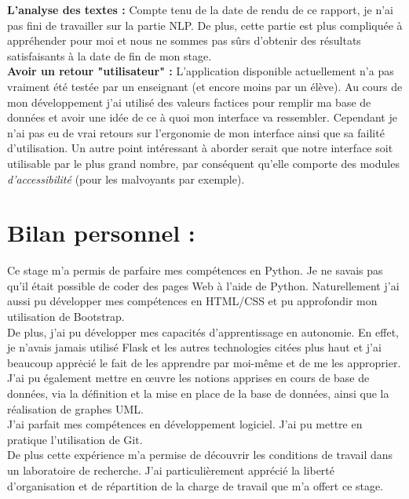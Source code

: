 \documentclass[12pt]{article}
\begin{document}
\textbf{L'analyse des textes :}  Compte tenu de la date de rendu de ce rapport, je n'ai pas fini de travailler sur la partie NLP. De plus, cette partie est plus compliquée à appréhender pour moi et nous ne sommes pas sûrs d'obtenir des résultats satisfaisants à la date de fin de mon stage. \\

\textbf{Avoir un retour "utilisateur" :} L'application disponible actuellement n'a pas vraiment été testée par un enseignant (et encore moins par un élève). Au cours de mon développement j'ai utilisé des valeurs factices pour remplir ma base de données et avoir une idée de ce à quoi mon interface va ressembler. Cependant je n'ai pas eu de vrai retours sur l'ergonomie de mon interface ainsi que sa failité d'utilisation. 
Un autre point intéressant à aborder serait que notre interface soit utilisable par le plus grand nombre, par conséquent qu'elle comporte des modules \textit{d'accessibilité} (pour les malvoyants par exemple). 


\section{Bilan personnel :}


Ce stage m’a permis de parfaire mes compétences en Python. Je ne savais pas qu’il était possible de coder des pages Web à l’aide de Python. Naturellement j’ai aussi pu développer mes compétences en HTML/CSS et pu approfondir mon utilisation de Bootstrap. \\
De plus, j'ai pu développer mes capacités d'apprentissage en autonomie. En effet, je n'avais jamais utilisé Flask et les autres technologies citées plus haut et j'ai beaucoup apprėcié le fait de les apprendre par moi-même et de me les approprier. \\
J’ai pu également mettre en œuvre les notions apprises en cours de base de données, via la définition et la mise en place de la base de données, ainsi que la réalisation de graphes UML. \\
J'ai parfait mes compétences en développement logiciel. J'ai pu mettre en pratique l'utilisation de Git. \\

De plus cette expérience m’a permise de découvrir les conditions de travail dans un laboratoire de recherche. J’ai particulièrement apprécié la liberté d’organisation et de répartition de la charge de travail que m’a offert ce stage. \\
\end{document}

